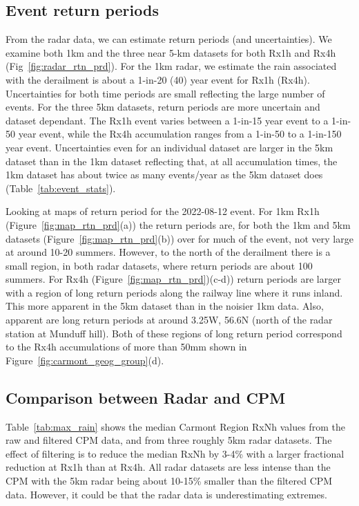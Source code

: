 \documentclass[11pt,a4paper]{article}
\begin{document}
\subsection{Event return periods}
From the radar data, we can estimate return periods (and uncertainties). We examine both 1km and the three near 5-km datasets for both Rx1h and Rx4h (Fig~\ref{fig:radar_rtn_prd}). For the 1km radar, we estimate the rain associated with the derailment is about a 1-in-20 (40) year event for Rx1h (Rx4h). Uncertainties for both time periods are small reflecting the large number of events. For the three 5km datasets, return periods are more uncertain and dataset dependant. The Rx1h event varies between a 1-in-15 year event to a 1-in-50 year event, while the Rx4h accumulation ranges from a 1-in-50 to a 1-in-150 year event. Uncertainties even for an individual dataset are larger in the 5km dataset than in the 1km dataset reflecting that, at all accumulation times, the 1km dataset has about twice as many events/year as the  5km dataset does (Table~\ref{tab:event_stats}).

Looking at maps of return period for the 2022-08-12 event. For 1km Rx1h (Figure~\ref{fig:map_rtn_prd}(a)) the return periods are, for both the 1km and 5km datasets (Figure~\ref{fig:map_rtn_prd}(b)) over  for much of the event, not very large at around 10-20 summers. However,  to the north of the derailment there is a small region, in both radar datasets, where return periods are about 100 summers.   For Rx4h (Figure~\ref{fig:map_rtn_prd})(c-d)) return periods are larger with a region of long return periods along the railway line where it runs inland. This more apparent in the 5km dataset than in the noisier 1km data. Also, apparent are long return periods at around 3.25W, 56.6N (north of the radar station at Munduff hill). Both of these regions of long return period correspond to the Rx4h accumulations of more than 50mm shown in Figure~\ref{fig:carmont_geog_group}(d). 

\subsection{Comparison between Radar and  CPM}

Table~\ref{tab:max_rain} shows the median Carmont Region RxNh values from the raw and filtered CPM data, and from three roughly 5km radar datasets.
 The effect of filtering is to reduce the median RxNh by 3-4\% with a larger fractional reduction at Rx1h than at Rx4h.  All  radar datasets are less intense than the CPM  with the 5km radar being about 10-15\% smaller than the filtered CPM data.  However, it could be that the radar data is underestimating extremes.
 
\end{document}
